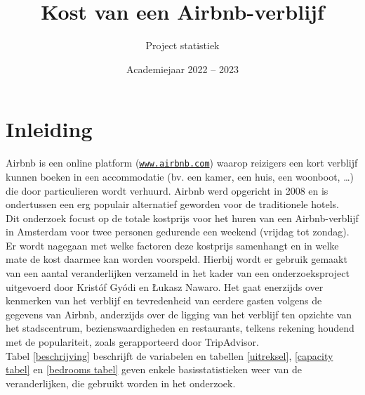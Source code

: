 \documentclass[a4paper]{kulakarticle}
\title{Kost van een Airbnb-verblijf}
\author{Project statistiek}
\date{Academiejaar 2022 -- 2023}
\begin{document}
	\maketitle
	\section*{Inleiding}
	Airbnb is een online platform (\href{https://www.airbnb.com}{\texttt{www.airbnb.com}}) waarop reizigers een kort verblijf kunnen boeken in een accommodatie (bv. een kamer, een huis, een woonboot, …) die door particulieren wordt verhuurd. Airbnb werd opgericht in 2008 en is ondertussen een erg populair alternatief geworden voor de traditionele hotels. \\
	
	Dit onderzoek focust op de totale kostprijs voor het huren van een Airbnb-verblijf in Amsterdam voor twee personen gedurende een weekend (vrijdag tot zondag). Er wordt nagegaan met welke factoren deze kostprijs samenhangt en in welke mate de kost daarmee kan worden voorspeld. Hierbij wordt er gebruik gemaakt van een aantal veranderlijken verzameld in het kader van een onderzoeksproject uitgevoerd door Kristóf Gyódi en Łukasz Nawaro. Het gaat enerzijds over kenmerken van het verblijf en tevredenheid van eerdere gasten volgens de gegevens van Airbnb, anderzijds over de ligging van het verblijf ten opzichte van het stadscentrum, bezienswaardigheden en restaurants, telkens rekening houdend met de populariteit, zoals gerapporteerd door TripAdvisor.\\
	
	Tabel \ref{beschrijving} beschrijft de variabelen en tabellen \ref{uitreksel}, \ref{capacity tabel} en \ref{bedrooms tabel} geven enkele basisstatistieken weer van de veranderlijken, die gebruikt worden in het onderzoek. \\\\
\end{document}
